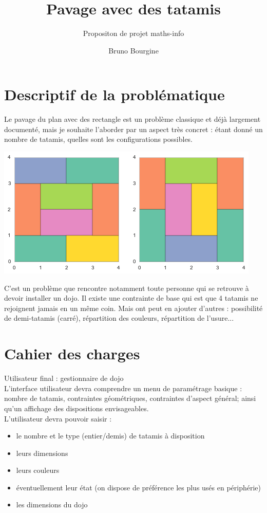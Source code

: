 \documentclass{scrartcl}
\begin{document}
    \title{Pavage avec des tatamis}
    \subtitle{Propositon de projet maths-info}
    \author{Bruno Bourgine}
    \maketitle

    \section{Descriptif de la problématique}


    Le pavage du plan avec des rectangle est un problème classique et déjà largement documenté,
    mais je souhaite l'aborder par un aspect très concret : étant donné un nombre de tatamis, quelles sont les 
    configurations possibles.\\
    \begin{center}
        \includegraphics[width = 0.5\linewidth]{pavage-par-tatamis.png}
    \end{center}
    C'est un problème que rencontre notamment toute personne qui se retrouve à devoir installer un dojo.
    Il existe une contrainte de base qui est que 4 tatamis ne rejoignent jamais en un même coin. Mais ont peut
    en ajouter d'autres : possibilité de demi-tatamis (carré), répartition des couleurs, répartition de l'usure...

    \section{Cahier des charges}

    Utilisateur final : gestionnaire de dojo\\

    L'interface utilisateur devra comprendre un menu de paramétrage basique : nombre de tatamis,
    contraintes géométriques, contraintes d'aspect général; ainsi qu'un affichage des dispositions envisageables.\\

    L'utilisateur devra pouvoir saisir :

    \begin{itemize}
        \item le nombre et le type (entier/demis) de tatamis à disposition
        \item leurs dimensions
        \item leurs couleurs
        \item éventuellement leur état (on dispose de préférence les plus usés en périphérie)
        \item les dimensions du dojo
    \end{itemize}
\end{document}
